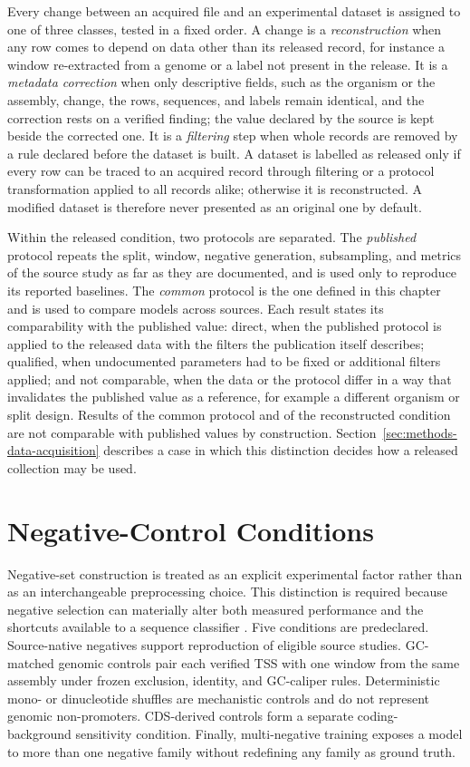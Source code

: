Every change between an acquired file and an experimental dataset is assigned
to one of three classes, tested in a fixed order. A change is a
\emph{reconstruction} when any row comes to depend on data other than its
released record, for instance a window re-extracted from a genome or a label
not present in the release. It is a \emph{metadata correction} when only
descriptive fields, such as the organism or the assembly, change, the rows,
sequences, and labels remain identical, and the correction rests on a verified
finding; the value declared by the source is kept beside the corrected one. It
is a \emph{filtering} step when whole records are removed by a rule declared
before the dataset is built. A dataset is labelled as released only if every
row can be traced to an acquired record through filtering or a protocol
transformation applied to all records alike; otherwise it is reconstructed.
A modified dataset is therefore never presented as an original one by default.

Within the released condition, two protocols are separated. The
\emph{published} protocol repeats the split, window, negative generation,
subsampling, and metrics of the source study as far as they are documented,
and is used only to reproduce its reported baselines. The \emph{common}
protocol is the one defined in this chapter and is used to compare models
across sources. Each result states its comparability with the published value:
direct, when the published protocol is applied to the released data with the
filters the publication itself describes; qualified, when undocumented
parameters had to be fixed or additional filters applied; and not comparable,
when the data or the protocol differ in a way that invalidates the published
value as a reference, for example a different organism or split design. Results
of the common protocol and of the reconstructed condition are not comparable
with published values by construction. Section~\ref{sec:methods-data-acquisition}
describes a case in which this distinction decides how a released collection
may be used.

\section{Negative-Control Conditions}\label{sec:protocol-negative-controls}

Negative-set construction is treated as an explicit experimental factor rather
than as an interchangeable preprocessing choice. This distinction is required
because negative selection can materially alter both measured performance and
the shortcuts available to a sequence classifier
\citep{gonzalez2025negative,krutzfeldt2020impact}. Five conditions are
predeclared. Source-native negatives support reproduction of eligible source
studies. GC-matched genomic controls pair each verified TSS with one window from
the same assembly under frozen exclusion, identity, and GC-caliper rules.
Deterministic mono- or dinucleotide shuffles are mechanistic controls and do not
represent genomic non-promoters. CDS-derived controls form a separate coding-
background sensitivity condition. Finally, multi-negative training exposes a
model to more than one negative family without redefining any family as ground
truth.


